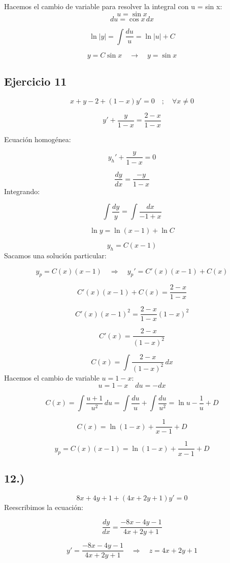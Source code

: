 \documentclass[a4paper,12pt]{article}
\begin{document}
\medskip
\noindent
Hacemos el cambio de variable para resolver la integral con u = sin x:
\[
u = \sin x
\]
\[
du = \cos x\, dx
\]

\[
\ln |y| = \int \frac{du}{u} = \ln |u| + C
\]

\[
y = C \sin x \quad \rightarrow \quad y = \sin x
\]

\subsection{Ejercicio 11}
\vspace{-1.2em}
\[
x + y - 2 + (1 - x) y' = 0 \quad ; \quad \forall x \neq 0
\]

\[
y' + \frac{y}{1 - x} = \frac{2 - x}{1 - x}
\]

Ecuación homogénea:

\[
y_h' + \frac{y}{1 - x} = 0
\]

\[
\frac{dy}{dx} = \frac{-y}{1 - x}
\]
\newpage
\noindent
Integrando:

\[
\int \frac{dy}{y} = \int \frac{dx}{-1 + x}
\]

\[
\ln y = \ln(x - 1) + \ln C
\]

\[
y_h = C (x - 1)
\]
Sacamos una solución particular:

\[
y_p = C(x)(x - 1) \quad \Rightarrow \quad y_p' = C'(x)(x - 1) + C(x)
\]

\[
C'(x)(x - 1) + C(x) = \frac{2 - x}{1 - x}
\]

\[
C'(x)(x - 1)^2 = \frac{2 - x}{1 - x} (1 - x)^2
\]

\[
C'(x) = \frac{2 - x}{(1 - x)^2}
\]

\[
C(x) = \int \frac{2 - x}{(1 - x)^2}\, dx
\]
Hacemos el cambio de variable \(u = 1 - x\):
\[
u = 1 - x \quad du = -dx
\]

\[
C(x) = \int \frac{u + 1}{u^2}\, du = \int \frac{du}{u} + \int \frac{du}{u^2} = \ln u - \frac{1}{u} + D
\]

\[
C(x) = \ln(1 - x) + \frac{1}{x - 1} + D
\]

\[
y_p = C(x)(x - 1) = \ln(1 - x) + \frac{1}{x - 1} + D
\]
\newpage
\noindent
\subsection*{12.)}
\[
8x + 4y + 1 + (4x + 2y + 1)y' = 0
\]
Reescribimos la ecuación:

\[
\frac{dy}{dx} = \frac{-8x - 4y - 1}{4x + 2y + 1}
\]

\[
y' = \frac{-8x - 4y - 1}{4x + 2y + 1} \quad \Rightarrow \quad z = 4x + 2y + 1
\]
\end{document}
